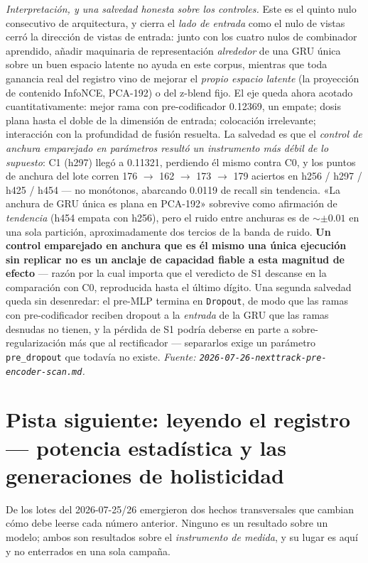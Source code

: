 \documentclass[11pt]{article}
\begin{document}
\emph{Interpretación, y una salvedad honesta sobre los controles.} Este es el
quinto nulo consecutivo de arquitectura, y cierra el \emph{lado de entrada} como
el nulo de vistas cerró la dirección de vistas de entrada: junto con los cuatro
nulos de combinador aprendido, añadir maquinaria de representación
\emph{alrededor} de una GRU única sobre un buen espacio latente no ayuda en este
corpus, mientras que toda ganancia real del registro vino de mejorar el
\emph{propio espacio latente} (la proyección de contenido InfoNCE, PCA-192) o del
z-blend fijo. El eje queda ahora acotado cuantitativamente: mejor rama con
pre-codificador \num{0.12369}, un empate; dosis plana hasta el doble de la
dimensión de entrada; colocación irrelevante; interacción con la profundidad de
fusión resuelta. La salvedad es que el \emph{control de anchura emparejado en
parámetros resultó un instrumento más débil de lo supuesto}: C1 (h297) llegó a
\num{0.11321}, perdiendo él mismo contra C0, y los puntos de anchura del lote
corren \num{176} $\to$ \num{162} $\to$ \num{173} $\to$ \num{179} aciertos en h256
/ h297 / h425 / h454 --- no monótonos, abarcando \num{0.0119} de recall sin
tendencia. «La anchura de GRU única es plana en PCA-192» sobrevive como
afirmación de \emph{tendencia} (h454 empata con h256), pero el ruido entre
anchuras es de ${\sim}\pm\num{0.01}$ en una sola partición, aproximadamente dos
tercios de la banda de ruido. \textbf{Un control emparejado en anchura que es él
mismo una única ejecución sin replicar no es un anclaje de capacidad fiable a
esta magnitud de efecto} --- razón por la cual importa que el veredicto de S1
descanse en la comparación con C0, reproducida hasta el último dígito. Una
segunda salvedad queda sin desenredar: el pre-MLP termina en \texttt{Dropout}, de
modo que las ramas con pre-codificador reciben dropout a la \emph{entrada} de la
GRU que las ramas desnudas no tienen, y la pérdida de S1 podría deberse en parte
a sobre-regularización más que al rectificador --- separarlos exige un parámetro
\texttt{pre\_dropout} que todavía no existe.
\emph{Fuente: \texttt{2026-07-26-nexttrack-pre-encoder-scan.md}.}

\section{Pista siguiente: leyendo el registro --- potencia estadística y las generaciones de holisticidad}
\label{sec:nexttrack-power}
De los lotes del 2026-07-25/26 emergieron dos hechos transversales que cambian
cómo debe leerse cada número anterior. Ninguno es un resultado sobre un modelo;
ambos son resultados sobre el \emph{instrumento de medida}, y su lugar es aquí y
no enterrados en una sola campaña.
\end{document}
